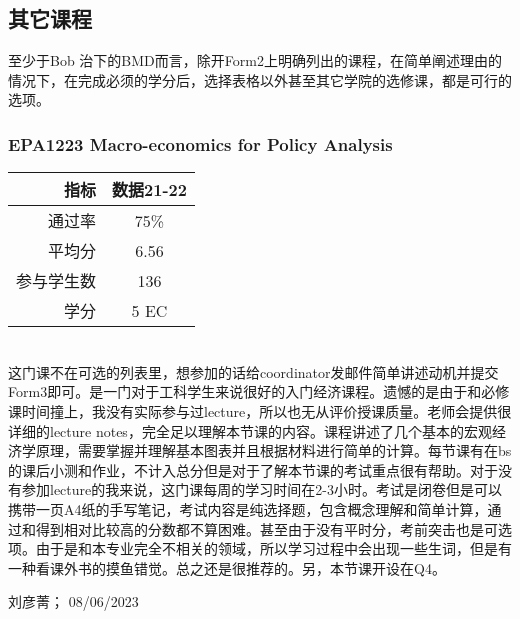 \vspace{\betsubsec} %
\subsection{其它课程}

至少于Bob 治下的BMD而言，除开Form2上明确列出的课程，在简单阐述理由的情况下，在完成必须的学分后，选择表格以外甚至其它学院的选修课，都是可行的选项。

\subsubsection{EPA1223 Macro-economics for Policy Analysis}
\begin{minipage}{0.45\textwidth}
\centering
{}
\end{minipage}%
\begin{minipage}{0.45\textwidth}
\raggedleft
\begin{tabular}{r|c}
\textbf{指标} & \textbf{数据21-22} \\ \hline
通过率 &75\% \\ 
平均分 & 6.56 \\ 
参与学生数 &136 \\
学分 & 5 EC\\
\end{tabular}
\end{minipage}\\

这门课不在可选的列表里，想参加的话给coordinator发邮件简单讲述动机并提交Form3即可。是一门对于工科学生来说很好的入门经济课程。遗憾的是由于和必修课时间撞上，我没有实际参与过lecture，所以也无从评价授课质量。老师会提供很详细的lecture notes，完全足以理解本节课的内容。课程讲述了几个基本的宏观经济学原理，需要掌握并理解基本图表并且根据材料进行简单的计算。每节课有在bs的课后小测和作业，不计入总分但是对于了解本节课的考试重点很有帮助。对于没有参加lecture的我来说，这门课每周的学习时间在2-3小时。考试是闭卷但是可以携带一页A4纸的手写笔记，考试内容是纯选择题，包含概念理解和简单计算，通过和得到相对比较高的分数都不算困难。甚至由于没有平时分，考前突击也是可选项。由于是和本专业完全不相关的领域，所以学习过程中会出现一些生词，但是有一种看课外书的摸鱼错觉。总之还是很推荐的。另，本节课开设在Q4。

\begin{flushright}
刘彦菁； 08/06/2023
\end{flushright}